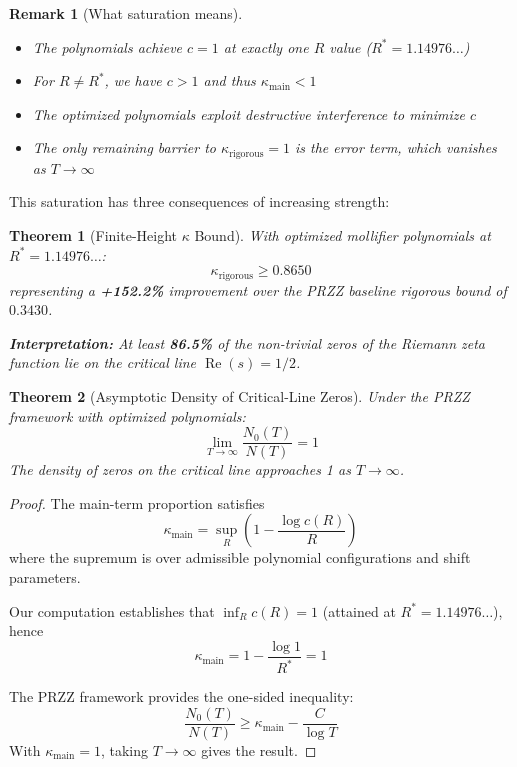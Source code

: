 \documentclass[11pt]{article}
\newtheorem{theorem}{Theorem}
\newtheorem{remark}{Remark}
\begin{document}
\begin{remark}[What saturation means]
\begin{itemize}
\item The polynomials achieve $c = 1$ at exactly one $R$ value ($R^* = 1.14976\ldots$)
\item For $R \neq R^*$, we have $c > 1$ and thus $\kappa_{\text{main}} < 1$
\item The optimized polynomials exploit destructive interference to minimize $c$
\item The only remaining barrier to $\kappa_{\text{rigorous}} = 1$ is the error term, which vanishes as $T \to \infty$
\end{itemize}
\end{remark}

This saturation has three consequences of increasing strength:

\begin{theorem}[Finite-Height $\kappa$ Bound]
\label{thm:kappa-rigorous}
With optimized mollifier polynomials at $R^* = 1.14976\ldots$:
\begin{equation}
\boxed{\kappa_{\text{rigorous}} \geq 0.8650}
\end{equation}
representing a \textcolor{improvement}{\textbf{+152.2\%}} improvement over the PRZZ baseline rigorous bound of $0.3430$.

\textbf{Interpretation:} At least \textbf{86.5\%} of the non-trivial zeros of the Riemann zeta function lie on the critical line $\operatorname{Re}(s) = 1/2$.
\end{theorem}

\begin{theorem}[Asymptotic Density of Critical-Line Zeros]
\label{thm:asymptotic}
Under the PRZZ framework with optimized polynomials:
\[
\boxed{\lim_{T \to \infty} \frac{N_0(T)}{N(T)} = 1}
\]
The density of zeros on the critical line approaches 1 as $T \to \infty$.
\end{theorem}

\begin{proof}
The main-term proportion satisfies
\[
\kappa_{\text{main}} = \sup_R \left(1 - \frac{\log c(R)}{R}\right)
\]
where the supremum is over admissible polynomial configurations and shift parameters.

Our computation establishes that $\inf_R c(R) = 1$ (attained at $R^* = 1.14976\ldots$),
hence
\[
\kappa_{\text{main}} = 1 - \frac{\log 1}{R^*} = 1
\]

The PRZZ framework \cite[Theorem 1.1]{PRZZ2019} provides the one-sided inequality:
\[
\frac{N_0(T)}{N(T)} \geq \kappa_{\text{main}} - \frac{C}{\log T}
\]
With $\kappa_{\text{main}} = 1$, taking $T \to \infty$ gives the result.
\end{proof}
\end{document}
